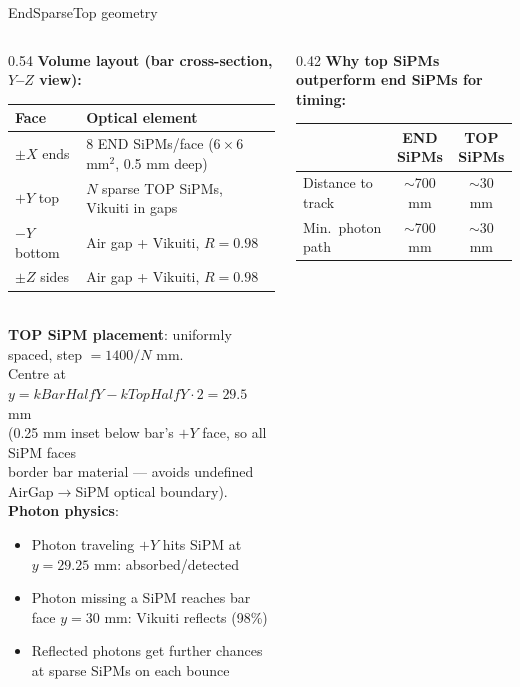 \documentclass[aspectratio=169,9pt]{beamer}
\begin{document}
\begin{frame}{EndSparseTop geometry}
\begin{columns}[T]
\begin{column}{0.54\textwidth}
\textbf{Volume layout (bar cross-section, $Y$--$Z$ view):}\\[0.5em]
\footnotesize
\begin{tabular}{ll}
\toprule
Face & Optical element\\
\midrule
$\pm X$ ends & 8 END SiPMs/face ($6\times6$ mm$^2$, 0.5 mm deep)\\
$+Y$ top & $N$ sparse TOP SiPMs, Vikuiti in gaps\\
$-Y$ bottom & Air gap + Vikuiti, $R{=}0.98$\\
$\pm Z$ sides & Air gap + Vikuiti, $R{=}0.98$\\
\bottomrule
\end{tabular}\\[0.6em]
\normalsize
\textbf{TOP SiPM placement}: uniformly spaced, step $= 1400/N$ mm.\\
Centre at $y = kBarHalfY - kTopHalfY\cdot 2 = 29.5$ mm\\
(0.25 mm inset below bar's $+Y$ face, so all SiPM faces\\
border bar material — avoids undefined AirGap$\to$SiPM optical boundary).\\[0.4em]
\textbf{Photon physics}:
\begin{itemize}\footnotesize
  \item Photon traveling $+Y$ hits SiPM at $y{=}29.25$ mm: absorbed/detected
  \item Photon missing a SiPM reaches bar face $y{=}30$ mm: Vikuiti reflects (98\%)
  \item Reflected photons get further chances at sparse SiPMs on each bounce
\end{itemize}
\end{column}
\begin{column}{0.42\textwidth}
\vspace{0.5em}
\textbf{Why top SiPMs outperform end SiPMs for timing:}\\[0.4em]
\footnotesize
\begin{tabular}{lcc}
\toprule
 & END SiPMs & TOP SiPMs\\
\midrule
Distance to track & $\sim$700 mm & $\sim$30 mm\\
Min.\ photon path & $\sim$700 mm & $\sim$30 mm\\

\end{tabular}
\end{column}
\end{columns}
\end{frame}
\end{document}
